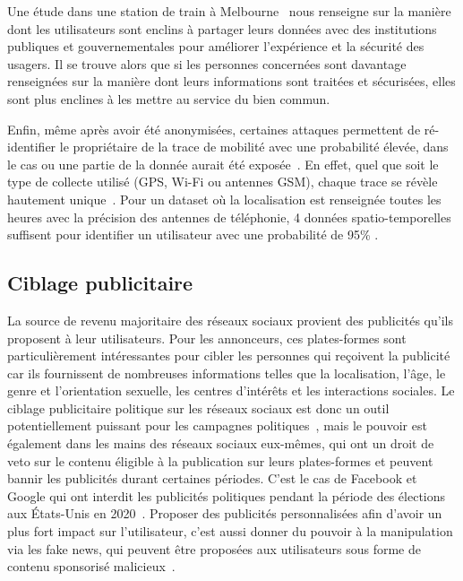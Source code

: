 \documentclass[runningheads]{llncs}
\begin{document}
Une étude dans une station de train à Melbourne~\cite{cabalquinto_it_2020} nous renseigne sur la manière dont les utilisateurs sont enclins à partager leurs données avec des institutions publiques et gouvernementales pour améliorer l'expérience et la sécurité des usagers. Il se trouve alors que si les personnes concernées sont davantage renseignées sur la manière dont leurs informations sont traitées et sécurisées, elles sont plus enclines à les mettre au service du bien commun.

Enfin, même après avoir été anonymisées, certaines attaques permettent de ré-identifier le propriétaire de la trace de mobilité avec une probabilité élevée, dans le cas ou une partie de la donnée aurait été exposée~\cite{zhang_asynchronous_2018}.
En effet, quel que soit le type de collecte utilisé (GPS, Wi-Fi ou antennes GSM), chaque trace se révèle hautement unique~\cite{boutet_uniqueness_2016}. Pour un dataset où la localisation est renseignée toutes les heures avec la précision des antennes de téléphonie, 4 données spatio-temporelles suffisent pour identifier un utilisateur avec une probabilité de 95\% \cite{montjoye_unique_2013}.


\subsection{Ciblage publicitaire}

La source de revenu majoritaire des réseaux sociaux provient des publicités qu'ils proposent à leur utilisateurs. Pour les annonceurs, ces plates-formes sont particulièrement intéressantes pour cibler les personnes qui reçoivent la publicité car ils fournissent de nombreuses informations telles que la localisation, l'âge, le genre et l'orientation sexuelle, les centres d'intérêts et les interactions sociales. Le ciblage publicitaire politique sur les réseaux sociaux est donc un outil potentiellement puissant pour les campagnes politiques~\cite{maruyama_hybrid_2014}, mais le pouvoir est également dans les mains des réseaux sociaux eux-mêmes, qui ont un droit de veto sur le contenu éligible à la publication sur leurs plates-formes et peuvent bannir les publicités durant certaines périodes. C'est le cas de Facebook et Google qui ont interdit les publicités politiques pendant la période des élections aux États-Unis en 2020~\cite{hannah_murphy_facebook_2020}. Proposer des publicités personnalisées afin d'avoir un plus fort impact sur l'utilisateur, c'est aussi donner du pouvoir à la manipulation via les fake news, qui peuvent être proposées aux utilisateurs sous forme de contenu sponsorisé malicieux~\cite{ribeiro_microtargeting_2019}.
\end{document}
